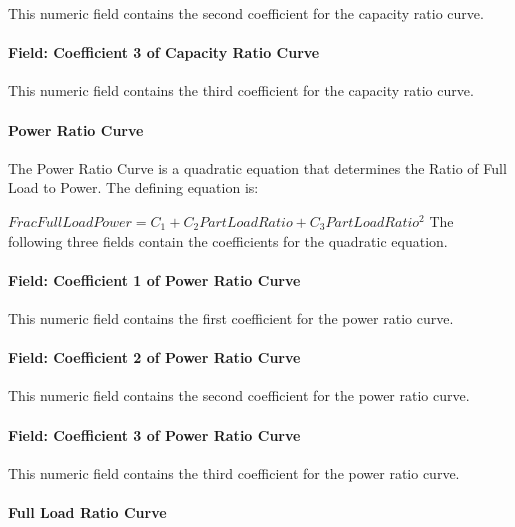 This numeric field contains the second coefficient for the capacity ratio curve.

\paragraph{Field: Coefficient 3 of Capacity Ratio Curve}\label{field-coefficient-3-of-capacity-ratio-curve-1}

This numeric field contains the third coefficient for the capacity ratio curve.

\paragraph{Power Ratio Curve}\label{power-ratio-curve-1}

The Power Ratio Curve is a quadratic equation that determines the Ratio of Full Load to Power. The defining equation is:

\(FracFullLoadPower = {C_1} + {C_2}PartLoadRatio + {C_3}PartLoadRati{o^2}\) The following three fields contain the coefficients for the quadratic equation.

\paragraph{Field: Coefficient 1 of Power Ratio Curve}\label{field-coefficient-1-of-power-ratio-curve}

This numeric field contains the first coefficient for the power ratio curve.

\paragraph{Field: Coefficient 2 of Power Ratio Curve}\label{field-coefficient-2-of-power-ratio-curve-1}

This numeric field contains the second coefficient for the power ratio curve.

\paragraph{Field: Coefficient 3 of Power Ratio Curve}\label{field-coefficient-3-of-power-ratio-curve-1}

This numeric field contains the third coefficient for the power ratio curve.

\paragraph{Full Load Ratio Curve}\label{full-load-ratio-curve-1}

